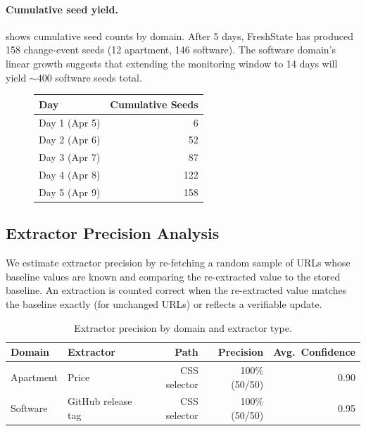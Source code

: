 \paragraph{Cumulative seed yield.}
 shows cumulative seed counts by domain.
After 5 days, FreshState has produced 158 change-event seeds (12 apartment,
146 software). The software domain's linear growth suggests that extending
the monitoring window to 14 days will yield ${\sim}400$ software seeds total.

\begin{figure}[t]
  \centering
  \begin{tabular}{lr}
    \toprule
    Day & Cumulative Seeds \\
    \midrule
    Day 1 (Apr 5) & 6 \\
    Day 2 (Apr 6) & 52 \\
    Day 3 (Apr 7) & 87 \\
    Day 4 (Apr 8) & 122 \\
    Day 5 (Apr 9) & 158 \\
    \bottomrule
  \end{tabular}
  \label{fig:seeds}
\end{figure}

\subsection{Extractor Precision Analysis}

We estimate extractor precision by re-fetching a random sample of URLs whose
baseline values are known and comparing the re-extracted value to the stored
baseline. An extraction is counted correct when the re-extracted value matches
the baseline exactly (for unchanged URLs) or reflects a verifiable update.

\begin{table}[t]
  \centering
  \caption{Extractor precision by domain and extractor type.}
  \label{tab:extractor}
  \begin{tabular}{llrrr}
    \toprule
    Domain & Extractor & Path & Precision & Avg.\ Confidence \\
    \midrule
    Apartment & Price    & CSS selector & 100\% (50/50) & 0.90 \\
    Software  & GitHub release tag & CSS selector & 100\% (50/50) & 0.95 \\
    \bottomrule
  \end{tabular}
\end{table}

